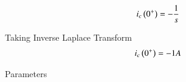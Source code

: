 \documentclass[journal,12pt,twocolumn]{IEEEtran}
\begin{document}
\begin{align}
    i_c \left(0^+\right) = - \frac{1}{s}
\end{align}

\bigskip
Taking Inverse Laplace Transform\\

\begin{align}
    i_c \left(0^+\right) = -1A
\end{align}

\begin{table}[ht]
    \begin{adjustbox}{width=\columnwidth}
       
    \end{adjustbox}
    \caption{Parameters}
    \label{tab:Gate.ec.44.1}

\end{table}
\end{document}
